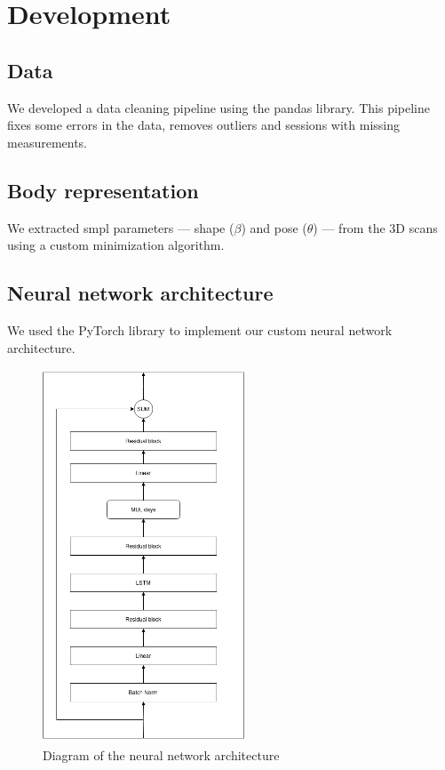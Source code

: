 
\chapter{Development}\label{development}
\section{Data}

We developed a data cleaning pipeline using the pandas library. This pipeline
fixes some errors in the data, removes outliers and sessions with missing
measurements.

\section{Body representation}

We extracted \gls{smpl} parameters --- shape ($\beta$) and pose ($\theta$) ---
from the 3D scans using a custom minimization algorithm.

\section{Neural network architecture}

We used the PyTorch library to implement our custom neural network
architecture.

\begin{figure}[h]
    \centering
    \includegraphics[width=6cm]{files/nn_diagram}
    \caption{Diagram of the neural network architecture}
\end{figure}

